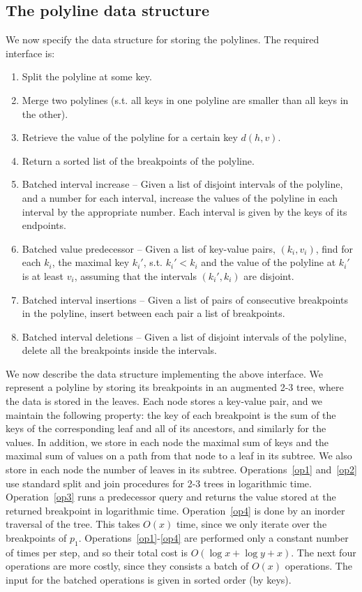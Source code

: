\documentclass[11pt,a4paper]{article}
\theoremstyle{definition}
\theoremstyle{remark}
\begin{document}
\subsection{The polyline data structure} We now specify the data structure for storing the polylines. The required interface is:
\begin{enumerate}
\item \label{op1} Split the polyline at some key.
\item \label{op2} Merge two polylines (s.t. all  keys in one polyline are smaller than all keys in the other).
\item \label{op3} Retrieve the value of the polyline for a certain key $d(h,v)$.
\item \label{op4}Return a sorted list of the breakpoints of the polyline.
\item \label{op5} Batched interval increase -- Given a list of disjoint intervals of the polyline, and a number for each interval, increase the values of the polyline in each interval by the appropriate number. Each interval is given by the keys of its endpoints.
\item \label{op6} Batched value predecessor -- Given a list of key-value pairs, $(k_i,v_i)$, find for each $k_i$, the maximal key $k_{i}'$, s.t. $k_{i}' < k_i$ and the value of the polyline at $k_{i}'$ is at least $v_i$, assuming that the intervals $(k_{i}',k_{i})$ are disjoint.
\item \label{op7} Batched interval insertions -- Given a list of pairs of consecutive breakpoints in the polyline, insert between each pair a list of breakpoints.
\item \label{op8} Batched interval deletions -- Given a list of disjoint intervals of the polyline, delete all the breakpoints inside the intervals.
\end{enumerate}
We now describe the data structure implementing the above interface. We represent a polyline by storing its breakpoints in an augmented 2-3 tree, where the data is stored in the leaves. Each node stores a key-value pair, and we maintain the following property: the key of each breakpoint is the sum of the keys of the corresponding leaf and all of its ancestors, and similarly for the values. In addition, we store in each node the maximal sum of keys and the maximal sum of values on a path from that node to a leaf in its subtree. We also store in each node the number of leaves in its subtree. Operations~\ref{op1} and~\ref{op2} use standard split and join procedures for 2-3 trees in logarithmic time. 
Operation~\ref{op3} runs a predecessor query and returns the value stored at the returned breakpoint in logarithmic time.
Operation~\ref{op4} is done by an inorder traversal of the tree. This takes $O(x)$ time, since we only iterate over the breakpoints of $p_{1}$. 
Operations~\ref{op1}-\ref{op4} are performed only a constant number of times per step, and so their total cost is $O(\log x + \log y + x)$. The next four operations are more costly, since they consists a batch of $O(x)$ operations. The input for the batched operations is given in sorted order (by keys).
\end{document}
